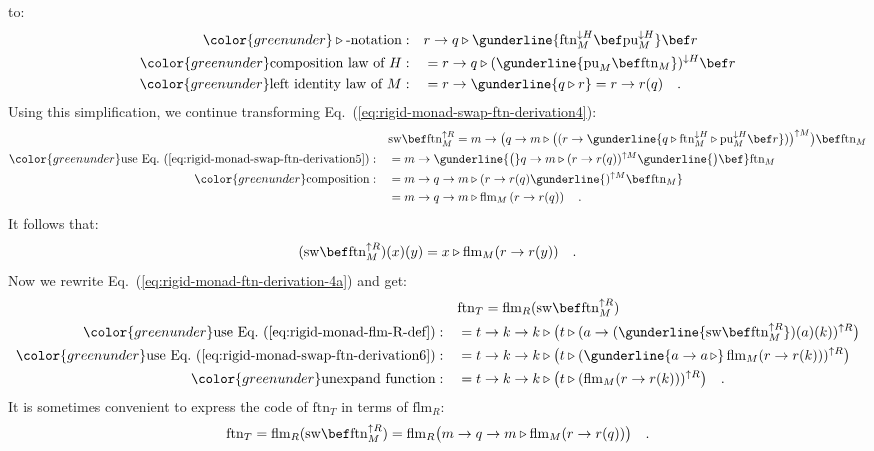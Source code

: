 to:
\begin{align}
{\color{greenunder}\triangleright\text{-notation}:}\quad & r\rightarrow q\triangleright\gunderline{\text{ftn}_{M}^{\downarrow H}\bef\text{pu}_{M}^{\downarrow H}}\bef r\nonumber \\
{\color{greenunder}\text{composition law of }H:}\quad & =r\rightarrow q\triangleright(\gunderline{\text{pu}_{M}\bef\text{ftn}_{M}})^{\downarrow H}\bef r\nonumber \\
{\color{greenunder}\text{left identity law of }M:}\quad & =r\rightarrow\gunderline{q\triangleright r}=r\rightarrow r(q)\quad.\label{eq:rigid-monad-swap-ftn-derivation5}
\end{align}
Using this simplification, we continue transforming Eq.~(\ref{eq:rigid-monad-swap-ftn-derivation4}):
\begin{align*}
 & \text{sw}\bef\text{ftn}_{M}^{\uparrow R}=m\rightarrow\big(q\rightarrow m\triangleright\big((r\rightarrow\gunderline{q\triangleright\text{ftn}_{M}^{\downarrow H}\triangleright\text{pu}_{M}^{\downarrow H}\bef r})\big)^{\uparrow M}\big)\bef\text{ftn}_{M}\\
{\color{greenunder}\text{use Eq.~(\ref{eq:rigid-monad-swap-ftn-derivation5})}:}\quad & =m\rightarrow\gunderline{\big(}q\rightarrow m\triangleright(r\rightarrow r(q))^{\uparrow M}\gunderline{\big)\bef}\text{ftn}_{M}\\
{\color{greenunder}\text{composition}:}\quad & =m\rightarrow q\rightarrow m\triangleright(r\rightarrow r(q)\gunderline{)^{\uparrow M}\bef\text{ftn}_{M}}\\
 & =m\rightarrow q\rightarrow m\triangleright\text{flm}_{M}\left(r\rightarrow r(q)\right)\quad.
\end{align*}
It follows that:
\begin{equation}
(\text{sw}\bef\text{ftn}_{M}^{\uparrow R})(x)(y)=x\triangleright\text{flm}_{M}(r\rightarrow r(y))\quad.\label{eq:rigid-monad-swap-ftn-derivation6}
\end{equation}
Now we rewrite Eq.~(\ref{eq:rigid-monad-ftn-derivation-4a}) and
get:
\begin{align*}
 & \text{ftn}_{T}=\text{flm}_{R}(\text{sw}\bef\text{ftn}_{M}^{\uparrow R})\\
{\color{greenunder}\text{use Eq.~(\ref{eq:rigid-monad-flm-R-def})}:}\quad & =t\rightarrow k\rightarrow k\triangleright\big(t\triangleright(a\rightarrow(\gunderline{\text{sw}\bef\text{ftn}_{M}^{\uparrow R}})(a)(k))^{\uparrow R}\big)\\
{\color{greenunder}\text{use Eq.~(\ref{eq:rigid-monad-swap-ftn-derivation6})}:}\quad & =t\rightarrow k\rightarrow k\triangleright\big(t\triangleright(\gunderline{a\rightarrow a\,\triangleright}\,\text{flm}_{M}(r\rightarrow r(k)))^{\uparrow R}\big)\\
{\color{greenunder}\text{unexpand function}:}\quad & =t\rightarrow k\rightarrow k\triangleright\big(t\triangleright(\text{flm}_{M}(r\rightarrow r(k)))^{\uparrow R}\big)\quad.
\end{align*}
It is sometimes convenient to express the code of $\text{ftn}_{T}$
in terms of $\text{flm}_{R}$:
\[
\text{ftn}_{T}=\text{flm}_{R}(\text{sw}\bef\text{ftn}_{M}^{\uparrow R})=\text{flm}_{R}\big(m\rightarrow q\rightarrow m\triangleright\text{flm}_{M}(r\rightarrow r(q))\big)\quad.
\]


